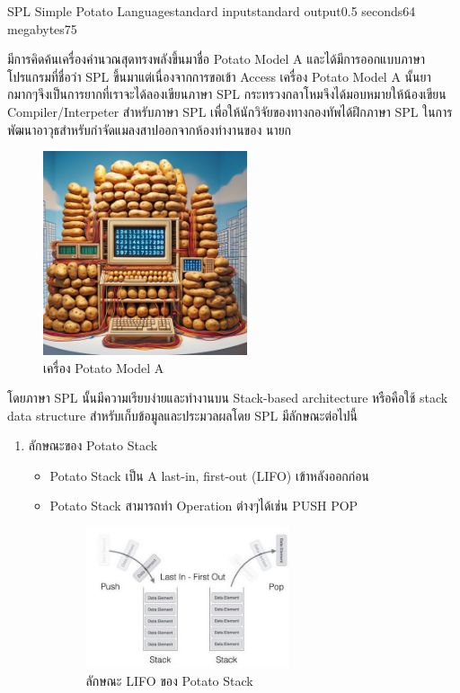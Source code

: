 \documentclass[11pt,a4paper]{article}
\begin{document}
\begin{problem}{SPL Simple Potato Language}{standard input}{standard output}{0.5 seconds}{64 megabytes}{75}

มีการคิดค้นเครื่องคำนวณสุดทรงพลังขึ้นมาชื่อ Potato Model A และได้มีการออกแบบภาษาโปรแกรมที่ชื่อว่า SPL ขึ้นมาแต่เนื่องจากการขอเข้า Access เครื่อง Potato Model A นั้นยากมากๆจึงเป็นการยากที่เราจะได้ลองเขียนภาษา SPL กระทรวงกลาโหมจึงได้มอบหมายให้น้องเขียน Compiler/Interpeter สำหรับภาษา SPL เพื่อให้นักวิจัยของทางกองทัพได้ฝึกภาษา SPL ในการพัฒนาอาวุธสำหรับกำจัดแมลงสาปออกจากห้องทำงานของ นายก

\begin{figure}[htp]
\centering
\includegraphics[width=6cm]{simplepotatolanguage/Potato Model A.png}
\caption{เครื่อง Potato Model A}
\end{figure}

\newpage

โดยภาษา SPL นั้นมีความเรียบง่ายและทำงานบน Stack-based architecture หรือคือใช้ stack data structure สำหรับเก็บข้อมูลและประมวลผลโดย SPL มีลักษณะต่อไปนี้
\begin{enumerate}
    \item ลักษณะของ Potato Stack
    \begin{itemize}
        \item Potato Stack เป็น A last-in, first-out (LIFO) เข้าหลังออกก่อน
        \item Potato Stack สามารถทำ Operation ต่างๆได้เช่น PUSH POP
        \begin{figure}[htp]
        \centering
        \includegraphics[width=6cm]{simplepotatolanguage/LIFO.png}
        \caption{ลักษณะ LIFO ของ Potato Stack}
        \end{figure}
    \end{itemize}
    

\end{enumerate}
\end{problem}
\end{document}
